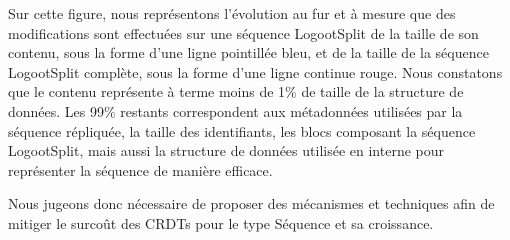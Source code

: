 Sur cette figure, nous représentons l'évolution au fur et à mesure que des modifications sont effectuées sur une séquence LogootSplit de la taille de son contenu, sous la forme d'une ligne pointillée bleu, et de la taille de la séquence LogootSplit complète, sous la forme d'une ligne continue rouge.
Nous constatons que le contenu représente à terme moins de 1\% de taille de la structure de données.
Les 99\% restants correspondent aux métadonnées utilisées par la séquence répliquée, \ie la taille des identifiants, les blocs composant la séquence LogootSplit, mais aussi la structure de données utilisée en interne pour représenter la séquence de manière efficace.

Nous jugeons donc nécessaire de proposer des mécanismes et techniques afin de mitiger le surcoût des \acp{CRDT} pour le type Séquence et sa croissance.

